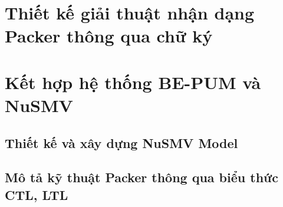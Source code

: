 \section{Thiết kế giải thuật nhận dạng Packer thông qua chữ ký}

\section{Kết hợp hệ thống BE-PUM và NuSMV}

\subsection{Thiết kế và xây dựng NuSMV Model}

\subsection{Mô tả kỹ thuật Packer thông qua biểu thức CTL, LTL}